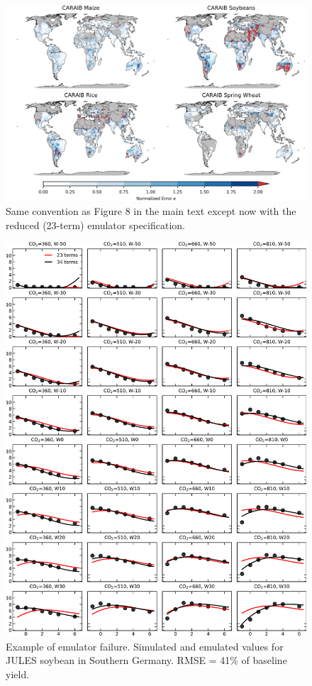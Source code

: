 \documentclass[10pt]{article}
\begin{document}
\begin{figure}[h!]
\centering
\includegraphics[width=15.5cm]{reduced_CARAIB_spatial_error.png}
\caption{Same convention as Figure 8 in the main text except now with the reduced (23-term) emulator specification.}
\label{fig:reducedcaraib}
\end{figure}


\begin{figure}[h!]
\includegraphics[width=\textwidth]{JULES_soy_bad.png}
\caption{Example of emulator failure. Simulated and emulated values for JULES soybean in Southern Germany. RMSE = 41\% of baseline yield.}
\label{fig:lpjmlrice}
\end{figure}
\end{document}

